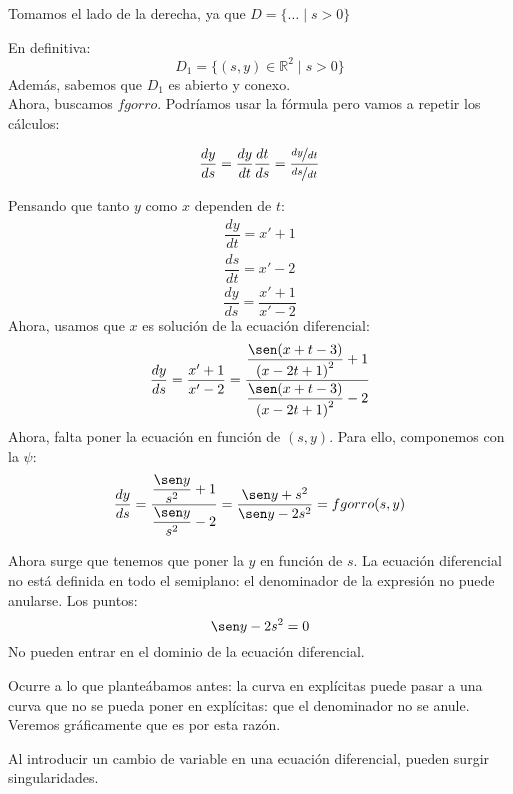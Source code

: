 \begin{ejemplo}
    Tomamos el lado de la derecha, ya que $D = \{\ldots \mid s>0\}$

    En definitiva:
    \begin{equation*}
        D_1 = \{(s,y)\in \mathbb{R}^2 \mid s>0\}
    \end{equation*}
    Además, sabemos que $D_1$ es abierto y conexo.\\

    Ahora, buscamos $fgorro$. Podríamos usar la fórmula pero vamos a repetir los cálculos:

    \begin{equation*}
        \dfrac{dy}{ds} = \dfrac{dy}{dt}\dfrac{dt}{ds} = \dfrac{\nicefrac{dy}{dt}}{\nicefrac{ds}{dt}}
    \end{equation*}

    Pensando que tanto $y$ como $x$ dependen de $t$:
    \begin{gather*}
        \dfrac{dy}{dt} = x' + 1 \\
        \dfrac{ds}{dt} = x' - 2 
    \end{gather*}
    \begin{equation*}
        \dfrac{dy}{ds} = \dfrac{x'+1}{x'-2}
    \end{equation*}
    Ahora, usamos que $x$ es solución de la ecuación diferencial:
    \begin{equation*}
        \dfrac{dy}{ds} = \dfrac{x'+1}{x'-2} = \dfrac{\dfrac{\sen(x+t-3)}{{(x-2t+1)}^{2}}+1}{\dfrac{\sen(x+t-3)}{{(x-2t+1)}^{2}}-2}
    \end{equation*}
    Ahora, falta poner la ecuación en función de $(s,y)$. Para ello, componemos con la $\psi$:
    \begin{equation*}
        \dfrac{dy}{ds} = \dfrac{\dfrac{\sen y}{s^2}+1}{\dfrac{\sen y}{s^2}-2} = \dfrac{\sen y+s^2}{\sen y -2s^2} = fgorro(s,y)
    \end{equation*}

Ahora surge que tenemos que poner la $y$ en función de $s$. La ecuación diferencial no está definida en todo el semiplano: el denominador de la expresión no puede anularse.
Los puntos:
\begin{equation*}
    \sen y -2s^2 = 0
\end{equation*}
No pueden entrar en el dominio de la ecuación diferencial.

Ocurre a lo que planteábamos antes: la curva en explícitas puede pasar a una curva que no se pueda poner en explícitas: que el denominador no se anule. Veremos gráficamente que es por esta razón.

Al introducir un cambio de variable en una ecuación diferencial, pueden surgir singularidades.

\end{ejemplo}

